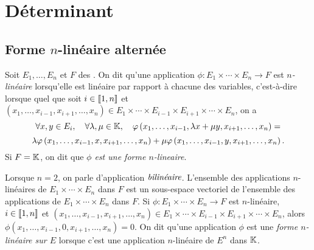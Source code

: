 \documentclass{magnolia}
\begin{document}
\magtoc


\section{Déterminant}
\subsection{Forme $n$-linéaire alternée}

\begin{definition}
Soit $E_1,\ldots,E_n$ et $F$ des \Kevs. On dit qu'une application $\phi:E_1\times\cdots\times E_n\to F$ est
\emph{$n$-linéaire} lorsqu'elle est linéaire par rapport à chacune des variables, c'est-à-dire lorsque
quel que soit $i\in\left\llbracket 1,n\right\rrbracket$ et $(x_1,\ldots,x_{i-1},x_{i+1},\ldots,x_n)\in E_1\times\cdots\times E_{i-1}\times E_{i+1}\times\cdots\times E_n$, on a
\[\forall x,y\in E_i,\quad \forall \lambda,\mu\in\mathbb{K},\quad \varphi\left(x_1,\ldots,x_{i-1},\lambda x+\mu y,x_{i+1},\ldots,x_n\right)=\]
\[\lambda \varphi\left(x_1,\ldots,x_{i-1},x,x_{i+1},\ldots,x_n\right)+
\mu \varphi\left(x_1,\ldots,x_{i-1},y,x_{i+1},\ldots,x_n\right).\]
Si $F=\mathbb{K}$, on dit que \emph{$\phi$ est une forme $n$-lineaire}.
\end{definition}



\begin{remarques}
\remarque Lorsque $n=2$, on parle d'application $\emph{bilinéaire}$.
\remarque L'ensemble des applications $n$-linéaires de $E_1\times\cdots\times E_n$ dans $F$ est
  un sous-espace vectoriel de l'ensemble des applications de $E_1\times\cdots\times E_n$ dans $F$.
\remarque Si $\phi:E_1\times\cdots\times E_n\to F$ est $n$-linéaire, $i\in\left\llbracket 1,n\right\rrbracket$ et
$(x_1,\ldots,x_{i-1},x_{i+1},\ldots,x_n)\in E_1\times\cdots\times E_{i-1}\times E_{i+1}\times\cdots\times E_n$, alors
  $\phi(x_1,\ldots,x_{i-1},0,x_{i+1},\ldots,x_n)=0$.
\remarque On dit qu'une application $\phi$ est une \emph{forme $n$-linéaire sur $E$} lorsque c'est une application $n$-linéaire de
  $E^n$ dans $\mathbb{K}$.
\end{remarques}
\end{document}
